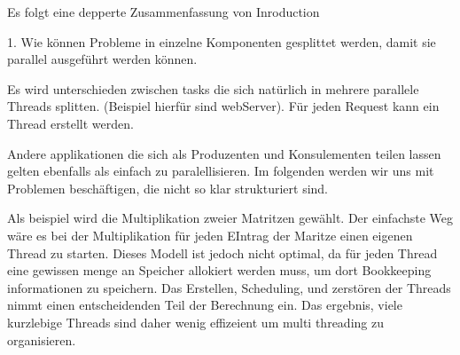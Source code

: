 

Es folgt eine depperte Zusammenfassung von Inroduction


1. Wie können Probleme in einzelne Komponenten gesplittet werden, damit sie parallel ausgeführt werden können.


Es wird unterschieden zwischen tasks die sich natürlich in mehrere parallele Threads splitten. (Beispiel hierfür sind webServer). Für jeden Request kann ein Thread erstellt werden.

Andere applikationen die sich als Produzenten und Konsulementen teilen lassen gelten ebenfalls als einfach zu paralellisieren. Im folgenden werden wir uns mit Problemen beschäftigen, die nicht so klar strukturiert sind.

Als beispiel wird die Multiplikation zweier Matritzen gewählt. Der einfachste Weg wäre es bei der Multiplikation für jeden EIntrag der Maritze einen eigenen Thread zu starten. Dieses Modell ist jedoch nicht optimal, da für jeden Thread eine gewissen menge an Speicher allokiert werden muss, um dort Bookkeeping informationen zu speichern. Das Erstellen, Scheduling, und zerstören der Threads nimmt einen entscheidenden Teil der Berechnung ein. Das ergebnis, viele kurzlebige Threads sind daher wenig effizeient um multi threading zu organisieren.
